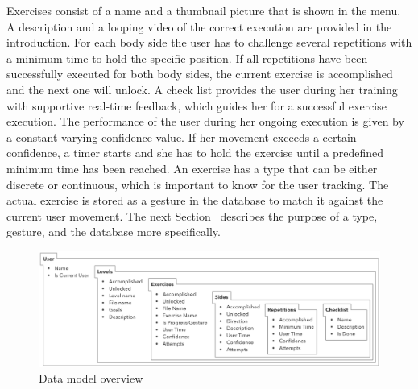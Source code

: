 Exercises consist of a name and a thumbnail picture that is shown in the menu. A description and a looping video of the correct execution are provided in the introduction.
For each body side the user has to challenge several repetitions with a minimum time to hold the specific position.
If all repetitions have been successfully executed for both body sides, the current exercise is accomplished and the next one will unlock.
A check list provides the user during her training with supportive real-time feedback, which guides her for a successful exercise execution.
The performance of the user during her ongoing execution is given by a constant varying confidence value.
If her movement exceeds a certain confidence, a timer starts and she has to hold the exercise until a predefined minimum time has been reached.
An exercise has a type that can be either discrete or continuous, which is important to know for the user tracking. 
The actual exercise is stored as a gesture in the database to match it against the current user movement.
The next Section~\textit{} describes the purpose of a type, gesture, and the database more specifically.

\begin{figure}[htb]
	\centering
	\begin{minipage}[t]{1\linewidth}
		\centering
		\includegraphics[width=1\linewidth]{Pictures/5_2_dataModel}
		\caption{Data model overview}
		\label{fig:5_2_dataModel}
	\end{minipage}
\end{figure}

